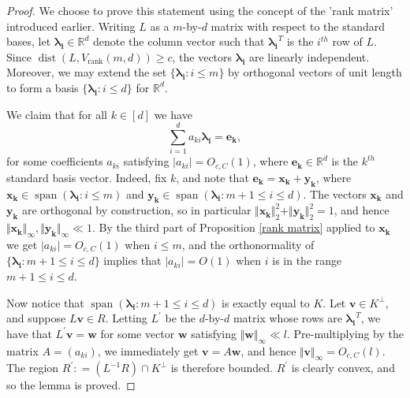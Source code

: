 \documentclass[12pt,a4paper,twoside,reqno]{amsart}
\newcommand{\rank}{\operatorname{rank}}
\numberwithin{equation}{section}
\begin{document}
\begin{proof}
We choose to prove this statement using the concept of the 'rank matrix' introduced earlier. Writing $L$ as a $m$-by-$d$ matrix with respect to the standard bases, let $\boldsymbol{\lambda_i} \in \mathbb{R}^d$ denote the column vector such that $\boldsymbol{\lambda_i}^T$ is the $i^{th}$ row of $L$. Since $\operatorname{dist}(L,V_{\rank}(m,d))\geqslant c$, the vectors $\boldsymbol{\lambda_i}$ are linearly independent. Moreover, we may extend the set $\{\boldsymbol{\lambda_i}:i\leqslant m\}$ by orthogonal vectors of unit length to form a basis $\{\boldsymbol{\lambda_i}:i\leqslant d\}$ for $\mathbb{R}^d$. 

We claim that for all $k\in [d]$ we have $$\sum\limits_{i=1}^{d}a_{ki}\boldsymbol{\lambda_i} = \mathbf{e_k},$$ for some coefficients $a_{ki}$ satisfying $\vert a_{ki}\vert = O_{c,C}(1)$, where $\mathbf{e_k}\in\mathbb{R}^d$ is the $k^{th}$ standard basis vector. Indeed, fix $k$, and note that $\mathbf{e_k} = \mathbf{x_k} + \mathbf{y_k}$, where $\mathbf{x_k} \in \operatorname{span}(\boldsymbol{\lambda_i}:i\leqslant m)$ and $\mathbf{y_k}\in \operatorname{span}(\boldsymbol{\lambda_i}:m+1\leqslant i\leqslant d)$. The vectors $\mathbf{x_k}$ and $\mathbf{y_k}$ are orthogonal by construction, so in particular $\Vert \mathbf{x_k}\Vert_2^2+ \Vert \mathbf{y_k}\Vert_2^2 = 1$, and hence $\Vert \mathbf{x_k}\Vert_{\infty}, \Vert \mathbf{y_k}\Vert_{\infty}\ll 1$. By the third part of Proposition \ref{rank matrix} applied to $\mathbf{x_k}$ we get $\vert a_{ki}\vert = O_{c,C}(1)$ when $i\leqslant m$, and the orthonormality of $\{\boldsymbol{\lambda_i}:m+1\leqslant i\leqslant d\}$ implies that $\vert a_{ki}\vert = O(1)$ when $i$ is in the range $m+1\leqslant i\leqslant d$. 

Now notice that $\operatorname{span}(\boldsymbol{\lambda_i}:m+1\leqslant i\leqslant d)$ is exactly equal to $K$. Let $\mathbf{v}\in K^\perp$, and suppose $L\mathbf{v}\in R$. Letting $L^\prime$ be the $d$-by-$d$ matrix whose rows are $\boldsymbol{\lambda_i}^T$, we have that $L^\prime \mathbf{v} = \mathbf{w}$ for some vector $\mathbf{w}$ satisfying $\Vert \mathbf{w}\Vert_{\infty}\ll l $. Pre-multiplying by the matrix $A = (a_{ki})$, we immediately get $\mathbf{v} = A\mathbf{w}$, and hence $\Vert \mathbf{v}\Vert_{\infty} = O_{c,C}(l)$. The region $R^\prime: = (L^{-1} R)\cap K^{\perp}$ is therefore bounded. $R^\prime$ is clearly convex, and so the lemma is proved. \qedhere 
\end{proof}
\end{document}
